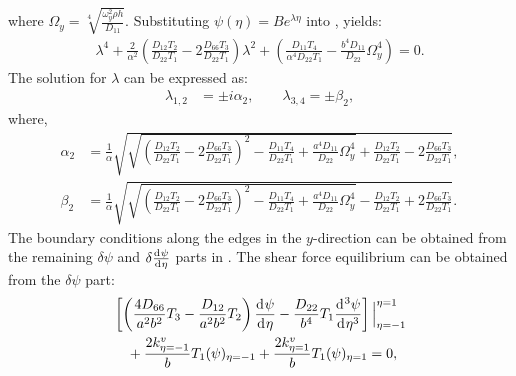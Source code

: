\documentclass[preprint,12pt]{elsarticle}
\newcommand{\id}{\mathrm{d}\mkern1mu}
\begin{document}
%
where \( \Omega_y = \sqrt[4]{\frac{\omega_y^2 \rho h}{D_{11}}} \).
Substituting \( \psi(\eta) = B e^{\lambda \eta} \) into , yields:
%
\begin{equation}\label{eq:ODEy2}
	\begin{split}
		\lambda^4 + \frac{2}{\alpha^2} \left( \frac{D_{12}T_2}{D_{22}T_1} - 2\frac{D_{66}T_3}{D_{22}T_1} \right) \lambda^2 + \left( \frac{D_{11}T_4}{\alpha^4D_{22}T_1} - \frac{b^4D_{11}}{D_{22}} \Omega_y^4 \right) = 0.
	\end{split}
\end{equation}
%
The solution for \( \lambda \) can be expressed as:
%
\begin{equation}\label{eq:lambda}
	\begin{split}
		\lambda_{1,2} &= \pm \textit{i} \alpha_2, \qquad \lambda_{3,4} = \pm \beta_2,
	\end{split}
\end{equation}
%
where,
%
\begin{subequations}\label{eq:beta}
	\begin{align}
		\alpha_2 &= \frac{1}{\alpha} \sqrt{ \sqrt{ \left( \frac{D_{12}T_2}{D_{22}T_1} - 2\frac{D_{66}T_3}{D_{22}T_1} \right)^2 - \frac{D_{11}T_4}{D_{22}T_1} + \frac{a^4 D_{11}}{D_{22}} \Omega_y^4 } + \frac{D_{12}T_2}{D_{22}T_1} - 2 \frac{D_{66}T_3}{D_{22}T_1}}, \\
		\beta_2 &= \frac{1}{\alpha} \sqrt{ \sqrt{ \left( \frac{D_{12}T_2}{D_{22}T_1} - 2 \frac{D_{66}T_3}{D_{22}T_1} \right)^2 - \frac{D_{11}T_4}{D_{22}T_1} + \frac{a^4 D_{11}}{D_{22}} \Omega_y^4 } - \frac{D_{12}T_2}{D_{22}T_1} + 2 \frac{D_{66}T_3}{D_{22}T_1}}.
	\end{align}
\end{subequations}
%
The boundary conditions along the edges in the \( y \)-direction can be obtained from the remaining \( \delta \psi \) and \( \delta \frac{\id \psi}{\id \eta} \) parts in . 
The shear force equilibrium can be obtained from the \( \delta \psi \) part:
%
\begin{equation}\label{eq:inertial_forcey}
	\begin{split}
		& \left[ \left( \frac{4D_{66}}{a^2b^2} T_3 - \frac{D_{12}}{a^2b^2} T_2 \right) \frac{\id \psi}{\id \eta} 
		- \frac{D_{22}}{b^4} T_1 \frac{\id^3 \psi}{\id \eta^3} \right] \Big|^{\eta=1}_{\eta=-1} \\
		&\quad + \frac{2k^v_{\eta=-1}}{b} T_1 (\psi )_{\eta=-1} + \frac{2k^v_{\eta=1}}{b} T_1 (\psi )_{\eta=1} = 0,
	\end{split}
\end{equation}
\end{document}
